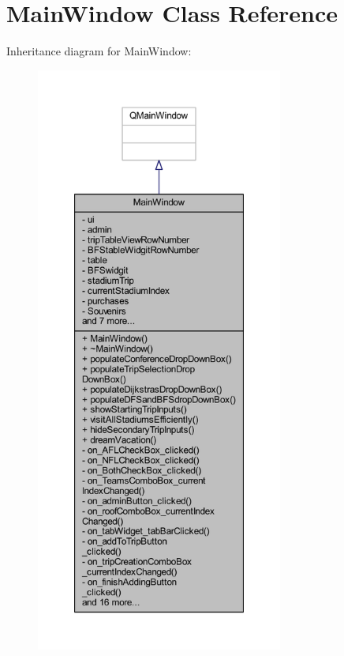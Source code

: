 \hypertarget{class_main_window}{}\section{Main\+Window Class Reference}
\label{class_main_window}


Inheritance diagram for Main\+Window\+:
\nopagebreak
\begin{figure}[H]
\begin{center}
\leavevmode
\includegraphics[height=550pt]{class_main_window__inherit__graph}
\end{center}
\end{figure}



